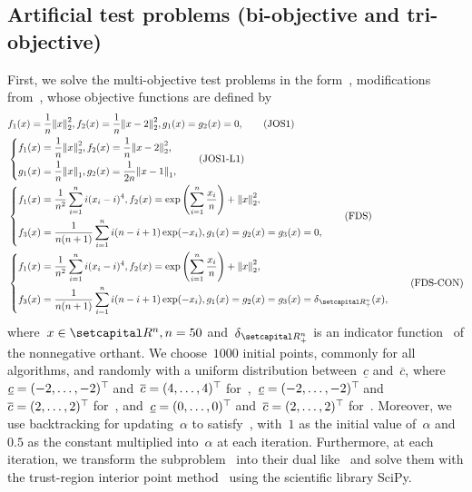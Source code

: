 \documentclass[../main]{subfiles}
\begin{document}
\subsection{Artificial test problems (bi-objective and tri-objective)}
First, we solve the multi-objective test problems in the form~, modifications from~\cite{Jin2001,Fliege2009}, whose objective functions are defined by
\begin{align}
    &f_1(x) = \frac{1}{n} \norm*{x}_2^2,
    f_2(x) = \frac{1}{n} \norm*{x - 2}_2^2,
    g_1(x) = g_2(x) = 0, \tag{JOS1}\label{eq:JOS1} \\
    &\left\{
        \begin{aligned}
            f_1(x) &= \frac{1}{n} \norm*{x}_2^2,
            f_2(x) = \frac{1}{n} \norm*{x - 2}_2^2, \\
            g_1(x) &= \frac{1}{n} \norm*{x}_1,
            g_2(x) = \frac{1}{2n} \norm*{x - 1}_1,
        \end{aligned} \right.
        \label{eq:JOS1_L1} \tag{JOS1-L1}\\
    &\left\{\begin{aligned} 
            f_1(x) &= \frac{1}{n^2} \sum_{i = 1}^{n} i (x_i - i)^4,
            f_2(x) = \exp \left( \sum_{i = 1}^{n} \frac{x_i}{n} \right) + \norm*{x}_2^2,\\
            f_3(x) &= \frac{1}{n (n + 1)} \sum_{i = 1}^{n} i (n - i + 1) \exp (- x_i),
            g_1(x) = g_2(x) = g_3(x) = 0,
    \end{aligned} \right. \label{eq:FDS} \tag{FDS}\\
    &\left\{\begin{aligned} 
            f_1(x) &= \frac{1}{n^2} \sum_{i = 1}^{n} i (x_i - i)^4,
            f_2(x) = \exp \left( \sum_{i = 1}^{n} \frac{x_i}{n} \right) + \norm*{x}_2^2,\\
            f_3(x) &= \frac{1}{n (n + 1)} \sum_{i = 1}^{n} i (n - i + 1) \exp (- x_i),
            g_1(x) = g_2(x) = g_3(x) = \indicator_{\setRpos^n}(x),
    \end{aligned} \right.\label{eq:FDS_CONSTRAINED} \tag{FDS-CON}
\end{align}
where~$x \in \setR^n, n = 50$ and~$\indicator_{\setRpos^n}$ is an indicator function~ of the nonnegative orthant.
We choose~$1000$ initial points, commonly for all algorithms, and randomly with a uniform distribution between~$\underline{c}$ and~$\overline{c}$, where~$\underline{c} = (-2, \dots, -2)^\top\hspace{-1pt}$ and~$\overline{c} = (4, \dots, 4)^\top\hspace{-1pt}$ for~,~$\underline{c} = (-2, \dots, -2)^\top\hspace{-1pt}$ and~$\overline{c} = (2, \dots, 2)^\top\hspace{-1pt}$ for~, and~$\underline{c} = (0, \dots, 0)^\top\hspace{-1pt}$ and~$\overline{c} = (2, \dots, 2)^\top\hspace{-1pt}$ for~.
Moreover, we use backtracking for updating~$\alpha$ to satisfy~, with~$1$ as the initial value of~$\alpha$ and~$0.5$ as the constant multiplied into~$\alpha$ at each iteration.
Furthermore, at each iteration, we transform the subproblem~ into their dual like~ and solve them with the trust-region interior point method~\cite{Byrd1999} using the scientific library SciPy.
\end{document}
